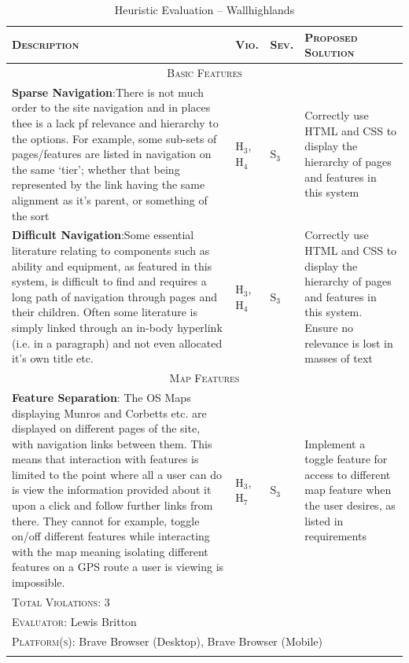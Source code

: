 \documentclass[11pt, english]{article}
\begin{document}
	\begin{center}
                \scriptsize
        \begin{longtable}{p{7.5cm}p{0.5cm}p{0.5cm}p{4cm}}
                \textsc{Description} & \textsc{Vio.} & \textsc{Sev.} & \textsc{Proposed Solution}\\
                \hline
		\multicolumn{4}{c}{\textsc{Basic Features}}\\
		\hline
			\textbf{Sparse Navigation}:\newline There is not much order to the site navigation and in places thee is a lack pf relevance and hierarchy to the options. For example, some sub-sets of pages/features are listed in navigation on the same `tier'; whether that being represented by the link having the same alignment as it's parent, or something of the sort & $\mathrm{H_{3}}$, $\mathrm{H_{4}}$ & $\mathrm{S_{3}}$ & Correctly use HTML and CSS to display the hierarchy of pages and features in this system\\
			\textbf{Difficult Navigation}:\newline Some essential literature relating to components such as ability and equipment, as featured in this system, is difficult to find and requires a long path of navigation through pages and their children. Often some literature is simply linked through an in-body hyperlink (i.e. in a paragraph) and not even allocated it's own title etc. & $\mathrm{H_{3}}$, $\mathrm{H_{4}}$ & $\mathrm{S_{3}}$ & Correctly use HTML and CSS to display the hierarchy of pages and features in this system. Ensure no relevance is lost in masses of text\\
		\hline
		\multicolumn{4}{c}{\textsc{Map Features}}\\
		\hline
			\textbf{Feature Separation}: The OS Maps displaying Munros and Corbetts etc. are displayed on different pages of the site, with navigation links between them. This means that interaction with features is limited to the point where all a user can do is view the information provided about it upon a click and follow further links from there. They cannot for example, toggle on/off different features while interacting with the map meaning isolating different features on a GPS route a user is viewing is impossible. & $\mathrm{H_{3}}$, $\mathrm{H_{7}}$ & $\mathrm{S_{3}}$ & Implement a toggle feature for access to different map feature when the user desires, as listed in requirements\\
		\hline
                \multicolumn{4}{l}{\textsc{Total Violations}: 3}\\
                \multicolumn{4}{l}{\textsc{Evaluator}: Lewis Britton}\\
                \multicolumn{4}{l}{\textsc{Platform(s)}: Brave Browser (Desktop), Brave Browser (Mobile)}\\
                \hline
                \caption{Heuristic Evaluation -- Wallhighlands}
        \end{longtable}
        \end{center}
\end{document}
